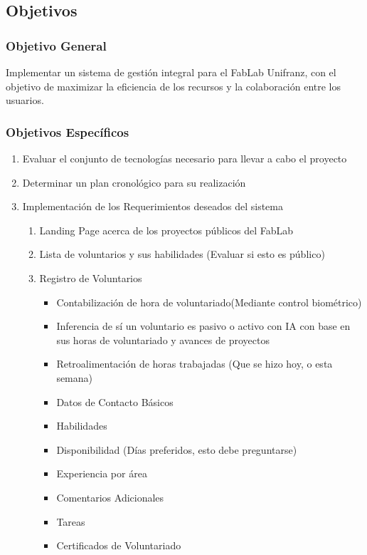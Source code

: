\documentclass{article}
\begin{document}
\subsection{Objetivos}
\subsubsection{Objetivo General}
Implementar un sistema de gestión integral para el FabLab Unifranz, con el objetivo de maximizar la eficiencia de los recursos y la colaboración entre los usuarios.
\subsubsection{Objetivos Específicos}
\begin{enumerate}
  \item Evaluar el conjunto de tecnologías necesario para llevar a cabo el proyecto
  \item Determinar un plan cronológico para su realización
  \item Implementación de los Requerimientos deseados del sistema
        \begin{enumerate}
          \item Landing Page acerca de los proyectos públicos del FabLab
          \item Lista de voluntarios y sus habilidades (Evaluar si esto es público)
          \item Registro de Voluntarios
                \begin{itemize}
                  \item Contabilización de hora de voluntariado(Mediante control biométrico)
                  \item Inferencia de sí un voluntario es pasivo o activo con IA con base en sus horas de voluntariado y avances de proyectos
                  \item Retroalimentación de horas trabajadas (Que se hizo hoy, o esta semana)
                  \item Datos de Contacto Básicos
                  \item Habilidades
                  \item Disponibilidad (Días preferidos, esto debe preguntarse)
                  \item Experiencia por área
                  \item Comentarios Adicionales
                  \item Tareas
                  \item Certificados de Voluntariado

\end{itemize}
\end{enumerate}
\end{enumerate}
\end{document}
